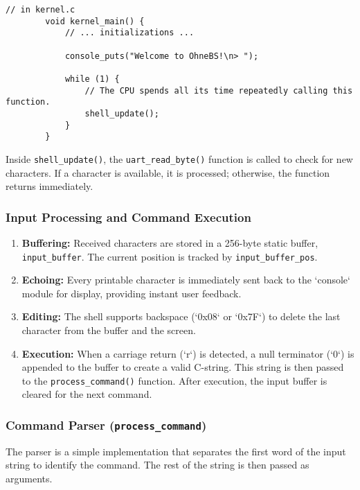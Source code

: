 \documentclass[a4paper, 11pt]{article}
\begin{document}
	\begin{lstlisting}[style=cstyle, caption={The main kernel loop, driving the shell.}]
		// in kernel.c
		void kernel_main() {
			// ... initializations ...
			
			console_puts("Welcome to OhneBS!\n> ");
			
			while (1) {
				// The CPU spends all its time repeatedly calling this function.
				shell_update();
			}
		}
	\end{lstlisting}
	
	Inside \texttt{shell\_update()}, the \texttt{uart\_read\_byte()} function is called to check for new characters. If a character is available, it is processed; otherwise, the function returns immediately.
	
	\subsubsection{Input Processing and Command Execution}
	\begin{enumerate}
		\item \textbf{Buffering:} Received characters are stored in a 256-byte static buffer, \texttt{input\_buffer}. The current position is tracked by \texttt{input\_buffer\_pos}.
		\item \textbf{Echoing:} Every printable character is immediately sent back to the `console` module for display, providing instant user feedback.
		\item \textbf{Editing:} The shell supports backspace (`0x08` or `0x7F`) to delete the last character from the buffer and the screen.
		\item \textbf{Execution:} When a carriage return (`r`) is detected, a null terminator (`0`) is appended to the buffer to create a valid C-string. This string is then passed to the \texttt{process\_command()} function. After execution, the input buffer is cleared for the next command.
	\end{enumerate}
	
	\subsubsection{Command Parser (\texttt{process\_command})}
	The parser is a simple implementation that separates the first word of the input string to identify the command. The rest of the string is then passed as arguments.
	
\end{document}
